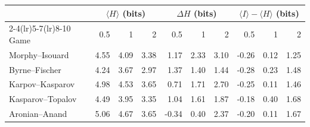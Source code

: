 \begin{tabular}{lrrrrrrrrr}
\toprule
 & \multicolumn{3}{c}{$\langle H\rangle$ (bits)} & \multicolumn{3}{c}{$\Delta H$ (bits)} & \multicolumn{3}{c}{$\langle I\rangle-\langle H\rangle$ (bits)} \\
\cmidrule(lr){2-4}\cmidrule(lr){5-7}\cmidrule(lr){8-10}
Game & 0.5 & 1 & 2 & 0.5 & 1 & 2 & 0.5 & 1 & 2 \\
\midrule
Morphy--Isouard & 4.55 & 4.09 & 3.38 & 1.17 & 2.33 & 3.10 & -0.26 & 0.12 & 1.25 \\
Byrne--Fischer & 4.24 & 3.67 & 2.97 & 1.37 & 1.40 & 1.44 & -0.28 & 0.23 & 1.48 \\
Karpov--Kasparov & 4.98 & 4.53 & 3.65 & 0.71 & 1.71 & 2.70 & -0.25 & 0.11 & 1.46 \\
Kasparov--Topalov & 4.49 & 3.95 & 3.35 & 1.04 & 1.61 & 1.87 & -0.18 & 0.40 & 1.68 \\
Aronian--Anand & 5.06 & 4.67 & 3.65 & -0.34 & 0.40 & 2.37 & -0.20 & 0.11 & 1.67 \\
\bottomrule
\end{tabular}
